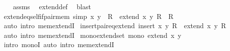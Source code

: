 \begin{isabellebody}
%
\isadelimproof
\ \ %
\endisadelimproof
%
\isatagproof
{}\isamarkupfalse%
\ assms\ \isamarkupfalse%
\ extend{\isacharunderscore}{\kern0pt}def\ \isamarkupfalse%
\ blast%
\endisatagproof
{\isafoldproof}%
%
\isadelimproof
\isanewline
%
\endisadelimproof
\isanewline
{}\isamarkupfalse%
\ extend{\isacharunderscore}{\kern0pt}eq{\isacharunderscore}{\kern0pt}self{\isacharunderscore}{\kern0pt}if{\isacharunderscore}{\kern0pt}pair{\isacharunderscore}{\kern0pt}mem\ {\isacharbrackleft}{\kern0pt}simp{\isacharbrackright}{\kern0pt}{\isacharcolon}{\kern0pt}\ {\isachardoublequoteopen}{\isasymlangle}x{\isacharcomma}{\kern0pt}\ y{\isasymrangle}\ {\isasymin}\ R\ {\isasymLongrightarrow}\ extend\ x\ y\ R\ {\isacharequal}{\kern0pt}\ R{\isachardoublequoteclose}\isanewline
%
\isadelimproof
\ \ %
\endisadelimproof
%
\isatagproof
{}\isamarkupfalse%
\ {\isacharparenleft}{\kern0pt}auto\ intro{\isacharcolon}{\kern0pt}\ mem{\isacharunderscore}{\kern0pt}extendI{\isacharprime}{\kern0pt}{\isacharparenright}{\kern0pt}%
\endisatagproof
{\isafoldproof}%
%
\isadelimproof
\isanewline
%
\endisadelimproof
\isanewline
{}\isamarkupfalse%
\ insert{\isacharunderscore}{\kern0pt}pair{\isacharunderscore}{\kern0pt}eq{\isacharunderscore}{\kern0pt}extend{\isacharcolon}{\kern0pt}\ {\isachardoublequoteopen}insert\ {\isasymlangle}x{\isacharcomma}{\kern0pt}\ y{\isasymrangle}\ R\ {\isacharequal}{\kern0pt}\ extend\ x\ y\ R{\isachardoublequoteclose}\isanewline
%
\isadelimproof
\ \ %
\endisadelimproof
%
\isatagproof
{}\isamarkupfalse%
\ {\isacharparenleft}{\kern0pt}auto\ intro{\isacharcolon}{\kern0pt}\ mem{\isacharunderscore}{\kern0pt}extendI{\isacharprime}{\kern0pt}{\isacharparenright}{\kern0pt}%
\endisatagproof
{\isafoldproof}%
%
\isadelimproof
\isanewline
%
\endisadelimproof
\isanewline
{}\isamarkupfalse%
\ mono{\isacharunderscore}{\kern0pt}extend{\isacharunderscore}{\kern0pt}set{\isacharcolon}{\kern0pt}\ {\isachardoublequoteopen}mono\ {\isacharparenleft}{\kern0pt}extend\ x\ y{\isacharparenright}{\kern0pt}{\isachardoublequoteclose}\isanewline
%
\isadelimproof
\ \ %
\endisadelimproof
%
\isatagproof
{}\isamarkupfalse%
\ {\isacharparenleft}{\kern0pt}intro\ monoI{\isacharparenright}{\kern0pt}\ {\isacharparenleft}{\kern0pt}auto\ intro{\isacharcolon}{\kern0pt}\ mem{\isacharunderscore}{\kern0pt}extendI{\isacharprime}{\kern0pt}{\isacharparenright}{\kern0pt}%
\endisatagproof
{\isafoldproof}%
%
\isadelimproof
\isanewline
%
\endisadelimproof
\isanewline
\isanewline
{}\isamarkupfalse%

\end{isabellebody}
